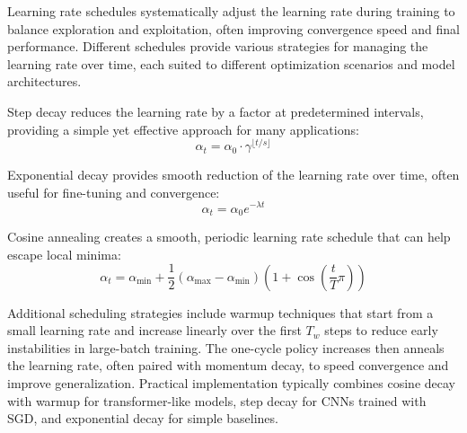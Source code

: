Learning rate schedules systematically adjust the learning rate during training to balance exploration and exploitation, often improving convergence speed and final performance. Different schedules provide various strategies for managing the learning rate over time, each suited to different optimization scenarios and model architectures.

Step decay reduces the learning rate by a factor at predetermined intervals, providing a simple yet effective approach for many applications:
\begin{equation}
\alpha_t = \alpha_0 \cdot \gamma^{\lfloor t / s \rfloor}
\end{equation}

Exponential decay provides smooth reduction of the learning rate over time, often useful for fine-tuning and convergence:
\begin{equation}
\alpha_t = \alpha_0 e^{-\lambda t}
\end{equation}

Cosine annealing creates a smooth, periodic learning rate schedule that can help escape local minima:
\begin{equation}
\alpha_t = \alpha_{\min} + \frac{1}{2}(\alpha_{\max} - \alpha_{\min})\left(1 + \cos\left(\frac{t}{T}\pi\right)\right)
\end{equation}

Additional scheduling strategies include warmup techniques that start from a small learning rate and increase linearly over the first \(T_w\) steps to reduce early instabilities in large-batch training. The one-cycle policy increases then anneals the learning rate, often paired with momentum decay, to speed convergence and improve generalization. Practical implementation typically combines cosine decay with warmup for transformer-like models, step decay for CNNs trained with SGD, and exponential decay for simple baselines.\cite{WebOptimizationDLBook,D2LChapterOptimization}

